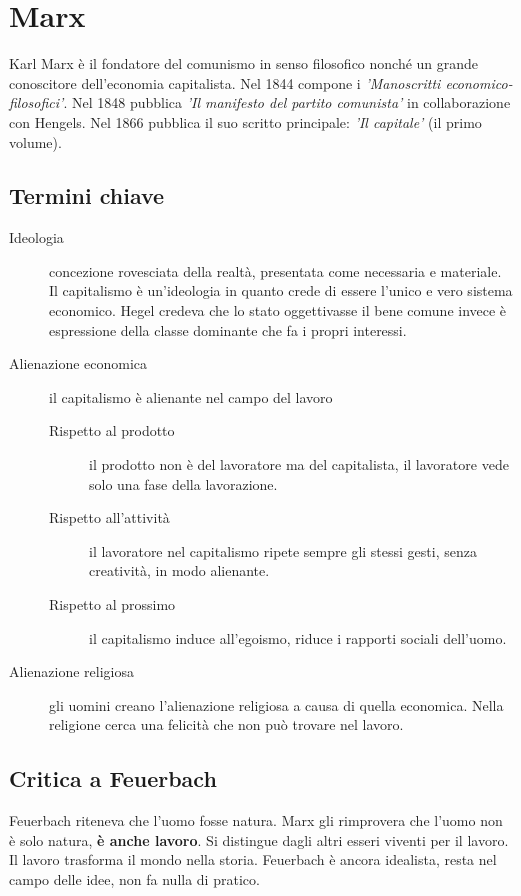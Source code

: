 
\section{Marx}
Karl Marx è il fondatore del comunismo in senso filosofico nonché un grande conoscitore dell'economia
capitalista. Nel 1844 compone i \textit{'Manoscritti economico-filosofici'}. Nel 1848 pubblica
\textit{'Il manifesto del partito comunista'} in collaborazione con Hengels. Nel 1866 pubblica il
suo scritto principale: \textit{'Il capitale'} (il primo volume).

\subsection{Termini chiave}
\begin{description}
  \item[Ideologia] concezione rovesciata della realtà, presentata come necessaria e materiale. Il
    capitalismo è un'ideologia in quanto crede di essere l'unico e vero sistema economico. Hegel
    credeva che lo stato oggettivasse il bene comune invece è espressione della classe dominante
    che fa i propri interessi.
  \item[Alienazione economica] il capitalismo è alienante nel campo del lavoro
    \begin{description}
      \item[Rispetto al prodotto] il prodotto non è del lavoratore ma del capitalista, il lavoratore
        vede solo una fase della lavorazione.
      \item[Rispetto all'attività] il lavoratore nel capitalismo ripete sempre gli stessi gesti,
        senza creatività, in modo alienante.
      \item[Rispetto al prossimo] il capitalismo induce all'egoismo, riduce i rapporti sociali
        dell'uomo.
    \end{description}
  \item[Alienazione religiosa] gli uomini creano l'alienazione religiosa a causa di quella economica.
    Nella religione cerca una felicità che non può trovare nel lavoro.
\end{description}

\subsection{Critica a Feuerbach}
Feuerbach riteneva che l'uomo fosse natura. Marx gli rimprovera che l'uomo non è solo natura,
\textbf{è anche lavoro}. Si distingue dagli altri esseri viventi per il lavoro. Il lavoro trasforma
il mondo nella storia. Feuerbach è ancora idealista, resta nel campo delle idee, non fa nulla di
pratico.

